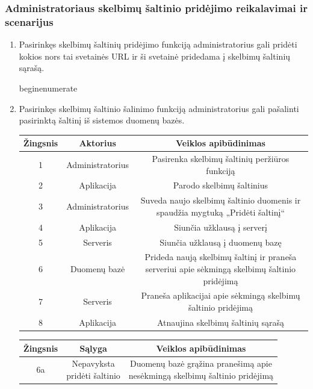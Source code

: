 \documentclass[12pt]{article}
\begin{document}
	\subsubsection{Administratoriaus skelbimų šaltinio pridėjimo reikalavimai ir scenarijus}
	\begin{enumerate}
		\item Pasirinkęs skelbimų šaltinių pridėjimo funkciją administratorius gali pridėti kokios nors tai svetainės URL ir ši svetainė pridedama į skelbimų šaltinių sąrašą.
		
		begin{enumerate}
		\item Pasirinkęs skelbimų šaltinio šalinimo funkciją administratorius gali pašalinti pasirinktą šaltinį iš sistemos duomenų bazės. 
		
		\begin{center}
		\begin{tabular}{ | c | c | c | }
			\hline
			Žingsnis & Aktorius         & Veiklos apibūdinimas \\ \hline
			1        & Administratorius & Pasirenka skelbimų šaltinių peržiūros funkciją \\ \hline
			2        & Aplikacija       & Parodo skelbimų šaltinius \\ \hline
			3        & Administratorius & \makecell{Suveda naujo skelbimų šaltinio duomenis ir \\ spaudžia mygtuką „Pridėti šaltinį“ } \\ \hline
			4        & Aplikacija       & Siunčia užklausą į serverį \\ \hline
			5        & Serveris         & Siunčia užklausą į duomenų bazę \\ \hline
			6        & Duomenų bazė     & \makecell{Prideda naują skelbimų šaltinį ir praneša \\ serveriui apie sėkmingą skelbimų šaltinio pridėjimą} \\ \hline
			7        & Serveris         & \makecell{Praneša aplikacijai apie sėkmingą skelbimų \\ šaltinio pridėjimą} \\ \hline
			8        & Aplikacija       & Atnaujina skelbimų šaltinių sąrašą \\ \hline
		\end{tabular}
		\end{center}	
		
		\begin{center}
		\begin{tabular}{ | c | c | c | }
			\hline
			Žingsnis & Sąlyga         & Veiklos apibūdinimas \\ \hline
			6a       & \makecell{Nepavyksta \\ pridėti šaltinio} & \makecell{Duomenų bazė grąžina pranešimą apie \\ nesėkmingą skelbimų šaltinio pridėjimą} \\ \hline
		\end{tabular}
		\end{center}		
	\end{enumerate}	
\end{document}
